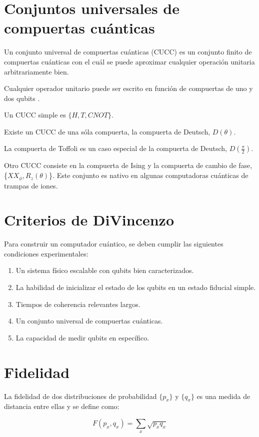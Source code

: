 \section{Conjuntos universales de compuertas cuánticas}
Un conjunto universal de compuertas cuánticas (CUCC) es un conjunto finito de compuertas cuánticas con el cuál se puede aproximar cualquier operación unitaria arbitrariamente bien.

Cualquier operador unitario puede ser escrito en función de compuertas de uno y dos qubits \cite{barenco}.

Un CUCC simple es $\{H,T,\mathit{CNOT}\}$.

Existe un CUCC de una sóla compuerta, la compuerta de Deutsch, $D(\theta)$.

La compuerta de Toffoli es un caso especial de la compuerta de Deutsch, $D(\frac{\pi}{2})$.

Otro CUCC consiste en la compuerta de Ising y la compuerta de cambio de fase, \{$\mathit{XX}_\phi,R_z(\theta)$\}. Este conjunto es nativo en algunas computadoras cuánticas de trampas de iones.

\section{Criterios de DiVincenzo}
Para construir un computador cuántico, se deben cumplir las siguientes condiciones experimentales:

\begin{enumerate}
    \item Un sistema físico escalable con qubits bien caracterizados.
    \item La habilidad de inicializar el estado de los qubits en un estado fiducial simple.
    \item Tiempos de coherencia relevantes largos.
    \item Un conjunto universal de compuertas cuánticas.
    \item La capacidad de medir qubits en específico.
\end{enumerate}

\section{Fidelidad}

La fidelidad de dos distribuciones de probabilidad $\{p_x\}$ y $\{q_x\}$ es una medida de distancia entre ellas y se define como:

\begin{equation}
    F(p_x, q_x) = \sum\limits_x \sqrt{p_x q_x}
\end{equation}

